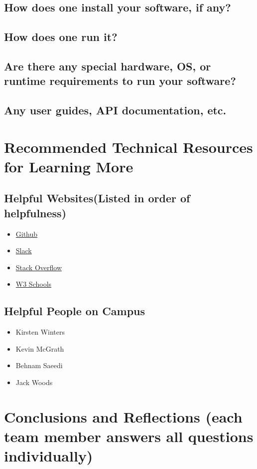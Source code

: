\documentclass[journal,10pt,onecolumn,compsoc]{IEEEtran}
\begin{document}
    \subsection{How does one install your software, if any?}
    \subsection{How does one run it?}
    \subsection{Are there any special hardware, OS, or runtime requirements to run your software?}
    \subsection{Any user guides, API documentation, etc.}
    \section{Recommended Technical Resources for Learning More}
    \subsection{Helpful Websites(Listed in order of helpfulness)}
	\begin{itemize}
    \item \href{https://github.com/}{Github}
    \item \href{https://slack.com/}{Slack}
    \item \href{https://stackoverflow.com/}{Stack Overflow}
	\item \href{https://www.w3schools.com/}{W3 Schools}
    \end{itemize}
    \subsection{Helpful People on Campus}
	\begin{itemize}
    \item Kirsten Winters
    \item Kevin McGrath
	\item Behnam Saeedi
    \item Jack Woods
    \end{itemize}
    \section{Conclusions and Reflections (each team member answers all questions individually)}
\end{document}
